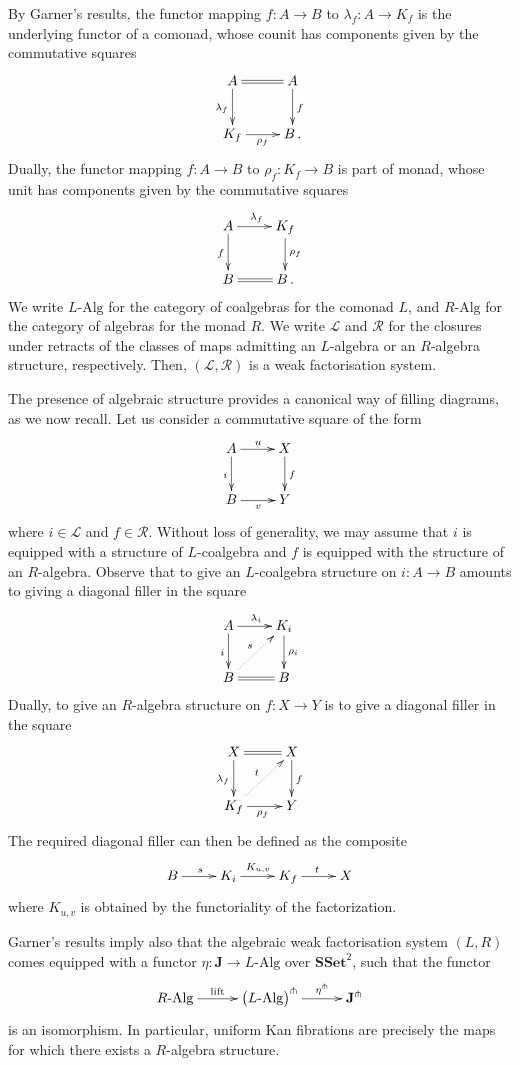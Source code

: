 \documentclass[reqno,10pt,a4paper,oneside]{amsart}
\newcommand{\xycenter}[1]{\vcenter{\hbox{\xymatrix{#1}}}}
\newcommand{\RAlg}{R\text{-}\mathrm{Alg}}
\newcommand{\LAlg}{L\text{-}\mathrm{Alg}}
\theoremstyle{definition}
\newcommand{\co}{\colon}
\newcommand{\SSet}{\mathbf{SSet}}
\begin{document}
\medskip

By Garner's results, the functor mapping $f \co A \to B$ to $\lambda_f \co A \to K_f$ is the underlying
functor of a comonad, whose counit has components given by the 
commutative squares
 \[
 \xymatrix{
 A \ar@{=}[r] \ar[d]_{\lambda_f} & A \ar[d]^f \\
 K_f \ar[r]_{\rho_f} & B \, . }
 \] 
Dually, the functor mapping $f \co A \to B$ to $\rho_f \co K_f \to B$ is part of monad, whose
unit has components given by the commutative squares
 \[
 \xycenter{
 A  \ar[d]_f \ar[r]^{\lambda_f}  & K_f \ar[d]^{\rho_f} \\
 B \ar@{=}[r] & B \, . }
 \]
 We write  $\LAlg$ for the category of coalgebras for the comonad $L$, and $\RAlg$ for the category of algebras for the monad $R$.   We write $\mathcal{L}$ and $\mathcal{R}$ for the
 closures under retracts of the classes of maps admitting an $L$-algebra 
 or an $R$-algebra structure, respectively. Then, $(\mathcal{L}, \mathcal{R})$ is a weak factorisation system. 
 
 \medskip
 
 The presence of algebraic structure provides a canonical way of filling diagrams, as we now recall. 
  Let us consider a commutative square of the form
 \[
 \xymatrix{
 A \ar[r]^u \ar[d]_i & X \ar[d]^f \\
 B \ar[r]_v & Y}
 \]
where $i \in \mathcal{L}$ and $f \in \mathcal{R}$. Without loss of generality, we may assume that
 $i$ is equipped with a structure of $L$-coalgebra and $f$ is equipped with the structure of an
 $R$-algebra. Observe that 
 to give an $L$-coalgebra structure on $i \co A \to B$ amounts
 to giving a diagonal filler in the square
 \[
 \xymatrix{
 A \ar[r]^{\lambda_i}  \ar[d]_{i} & K_i \ar[d]^{\rho_i} \\
 B \ar@{=}[r]  \ar@{.>}[ur]^s & B }
 \]
 Dually, to give an $R$-algebra structure on  $f \co X \to Y$ is to give
 a diagonal filler in the square
 \[
 \xymatrix{
 X  \ar@{=}[r]    \ar[d]_{\lambda_f} & X \ar[d]^f \\
 K_f \ar[r]_{\rho_f}  \ar@{.>}[ur]^t & Y }
 \]
The required diagonal filler  can then be defined as the composite
 \[
 \xymatrix{ B \ar[r]^{s} & K_i \ar[r]^{K_{u,v}} & K_f \ar[r]^{t} & X}
 \]
 where $K_{u,v}$ is obtained by the functoriality of the factorization. 
 
\medskip

Garner's results imply also that the algebraic weak factorisation system
 $(L, R)$  comes equipped with a functor $\eta \co \mathbf{J} \to \LAlg$
 over $\SSet^2$, such that the functor
 \[
 \xymatrix@C=1cm{
  \RAlg \ar[r]^-{\textup{lift}} &
    \big( \LAlg \big)^\pitchfork \ar[r]^-{\eta^\pitchfork} &
   \mathbf{J}^\pitchfork}
  \]
  is an isomorphism. In particular, uniform Kan fibrations are precisely
  the maps for which there exists a $R$-algebra structure. 
 
  

\vfill
 
\end{document}
